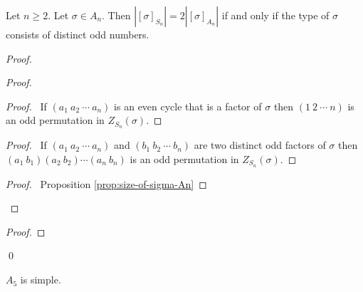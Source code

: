 \begin{prop}
\label{prop:conjugacy-split}
Let $n \geq 2$. Let $\sigma \in A_n$. Then $|[\sigma]_{S_n}| = 2|[\sigma]_{A_n}|$ if and only if the type of $\sigma$ consists of distinct odd numbers.
\end{prop}

\begin{proof}
\pf
{}
\begin{proof}
	\begin{proof}
		\pf\ If $(a_1\ a_2\ \cdots\ a_n)$ is an even cycle that is a factor of $\sigma$ then $(1\ 2\ \cdots\ n)$ is an odd permutation in $Z_{S_n}(\sigma)$.
	\end{proof}
	\begin{proof}
		\pf\ If $(a_1\ a_2\ \cdots\ a_n)$ and $(b_1\ b_2\ \cdots\ b_n)$ are two distinct odd factors of $\sigma$ then $(a_1\ b_1)(a_2\ b_2) \cdots (a_n\ b_n)$ is an odd permutation in $Z_{S_n}(\sigma)$.
	\end{proof}
	\qedstep
	\begin{proof}
		\pf\ Proposition \ref{prop:size-of-sigma-An}
	\end{proof}
\end{proof}
\begin{proof}
\end{proof}
\qed
\end{proof}

\begin{cor}
\label{cor:A5-simple}
$A_5$ is simple.
\end{cor}

